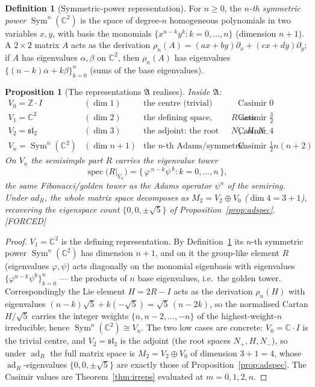 \documentclass[11pt]{article}
\newcommand{\A}{𝔄}
\theoremstyle{plain}
\newtheorem{proposition}[theorem]{Proposition}
\theoremstyle{definition}
\newtheorem{definition}[theorem]{Definition}
\theoremstyle{remark}
\newcommand{\Forced}{\textcolor{forcedc}{[FORCED]}}
\newcommand{\ad}{\operatorname{ad}}
\newcommand{\spec}{\operatorname{spec}}
\begin{document}
\begin{definition}[Symmetric-power representation]\label{def:sympow}
For $n≥0$, the \emph{$n$-th symmetric power} $\operatorname{Sym}^{n}(ℂ^{2})$ is the space of degree-$n$ homogeneous polynomials in two variables $x,y$, with basis the monomials $\{x^{n-k}y^{k}:k=0,\dots,n\}$ (dimension $n+1$). A $2×2$ matrix $A$ acts as the derivation $ρ_n(A)=(ax+by)\partial_x+(cx+dy)\partial_y$; if $A$ has eigenvalues $α,β$ on $ℂ^{2}$, then $ρ_n(A)$ has eigenvalues $\{(n-k)α+kβ\}_{k=0}^{n}$ (sums of the base eigenvalues).
\end{definition}

\begin{proposition}[The representations $\A$ realises]\label{prop:reps-in-A}
Inside $\A$:
\[
\begin{array}{llll}
V_0=ℤ\!\cdot\! I & (\dim 1) & \text{the centre (trivial)} & \text{Casimir }0\\
V_1=ℂ^{2} & (\dim 2) & \text{the defining space, where $R$ acts} & \text{Casimir }\tfrac32\\
V_2=𝔰𝔩_2 & (\dim 3) & \text{the adjoint: the root spaces }N_+,H,N_- & \text{Casimir }4\\
V_n=\operatorname{Sym}^{n}(ℂ^{2}) & (\dim n{+}1) & \text{the $n$-th Adams/symmetric power} & \text{Casimir }\tfrac12 n(n{+}2)
\end{array}
\]
On $V_n$ the semisimple part $R$ carries the eigenvalue \emph{tower}
\[
\spec\bigl(R|_{V_n}\bigr)=\{\,φ^{\,n-k}ψ^{\,k}:k=0,\dots,n\,\},
\]
the same Fibonacci/golden tower as the Adams operator $ψ^{n}$ of the semiring. Under $ad_R$, the whole matrix space decomposes as $M_2=V_2⊕V_0$ ($\dim 4=3+1$), recovering the eigenspace count $\{0,0,\pm\sqrt5\}$ of Proposition~\ref{prop:adspec}. \Forced
\end{proposition}
\begin{proof}
$V_1=ℂ^{2}$ is the defining representation. By Definition~\ref{def:sympow} its $n$-th symmetric power $\operatorname{Sym}^{n}(ℂ^{2})$ has dimension $n+1$, and on it the group-like element $R$ (eigenvalues $φ,ψ$) acts diagonally on the monomial eigenbasis with eigenvalues $\{φ^{n-k}ψ^{k}\}_{k=0}^{n}$ --- the products of $n$ base eigenvalues, i.e.\ the golden tower. Correspondingly the Lie element $H=2R-I$ acts as the derivation $ρ_n(H)$ with eigenvalues $(n-k)\sqrt5+k(-\sqrt5)=\sqrt5\,(n-2k)$, so the normalised Cartan $H/\sqrt5$ carries the integer weights $\{n,n-2,\dots,-n\}$ of the highest-weight-$n$ irreducible; hence $\operatorname{Sym}^{n}(ℂ^{2})≅V_n$. The two low cases are concrete: $V_0=ℂ\!\cdot\! I$ is the trivial centre, and $V_2=𝔰𝔩_2$ is the adjoint (the root spaces $N_+,H,N_-$), so under $\ad_R$ the full matrix space is $M_2=V_2⊕V_0$ of dimension $3+1=4$, whose $\ad_R$-eigenvalues $\{0,0,\pm\sqrt5\}$ are exactly those of Proposition~\ref{prop:adspec}. The Casimir values are Theorem~\ref{thm:irreps} evaluated at $m=0,1,2,n$.
\end{proof}
\end{document}
